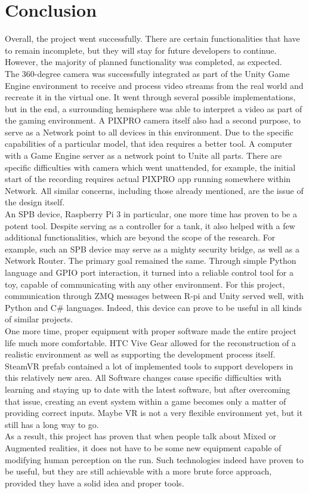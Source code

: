 \chapter{Conclusion}
Overall, the project went successfully.
There are certain functionalities that have to remain incomplete, but they will stay for future developers to continue.
However, the majority of planned functionality was completed, as expected.\\[1pt]
The 360-degree camera was successfully integrated as part of the Unity Game Engine environment to receive and process video streams from the real world and recreate it in the virtual one.
It went through several possible implementations, but in the end, a surrounding hemisphere was able to interpret a video as part of the gaming environment.
A PIXPRO camera itself also had a second purpose, to serve as a Network point to all devices in this environment.
Due to the specific capabilities of a particular model, that idea requires a better tool.
A computer with a Game Engine server as a network point to Unite all parts.
There are specific difficulties with camera which went unattended, for example, the initial start of the recording requires actual PIXPRO app running somewhere within Network.
All similar concerns, including those already mentioned, are the issue of the design itself.\\[1pt]
An SPB device, Raspberry Pi 3 in particular, one more time has proven to be a potent tool.
Despite serving as a controller for a tank, it also helped with a few additional functionalities, which are beyond the scope of the research. For example, such an SPB device may serve as a mighty security bridge, as well as a Network Router.
The primary goal remained the same. Through simple Python language and GPIO port interaction, it turned into a reliable control tool for a toy, capable of communicating with any other environment.
For this project, communication through ZMQ messages between R-pi and Unity served well, with Python and C\# languages.
Indeed, this device can prove to be useful in all kinds of similar projects.\\[1pt]
One more time, proper equipment with proper software made the entire project life much more comfortable.
HTC Vive Gear allowed for the reconstruction of a realistic environment as well as supporting the development process itself.
SteamVR prefab contained a lot of implemented tools to support developers in this relatively new area.
All Software changes cause specific difficulties with learning and staying up to date with the latest software, but after overcoming that issue, creating an event system within a game becomes only a matter of providing correct inputs.
Maybe VR is not a very flexible environment yet, but it still has a long way to go.\\[1pt]
As a result, this project has proven that when people talk about Mixed or Augmented realities, it does not have to be some new equipment capable of modifying human perception on the run.
Such technologies indeed have proven to be useful, but they are still achievable with a more brute force approach, provided they have a solid idea and proper tools.
